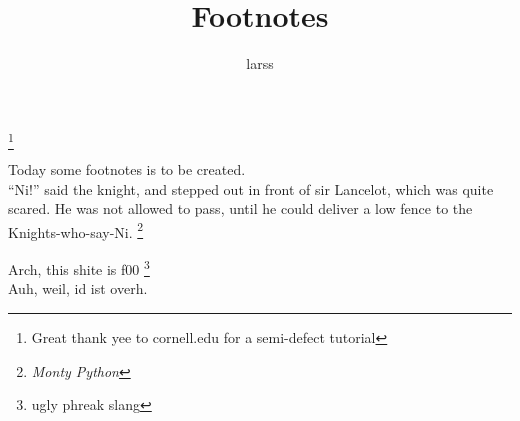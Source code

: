 \documentclass{article}
\begin{document}
\title{Footnotes}
\author{larss}
\thanks{Great thank yee to cornell.edu for a semi-defect tutorial}
\maketitle

Today some footnotes is to be created.\\

``Ni!'' said the knight, and stepped out in front of sir Lancelot, which was quite scared.
He was not allowed to pass, until he could deliver a low fence to the Knights-who-say-Ni.
\footnote{{\em Monty Python}}


Arch, this shite is f00 \footnote{ugly phreak slang}\\


Auh, weil, id ist overh.
\end{document}
